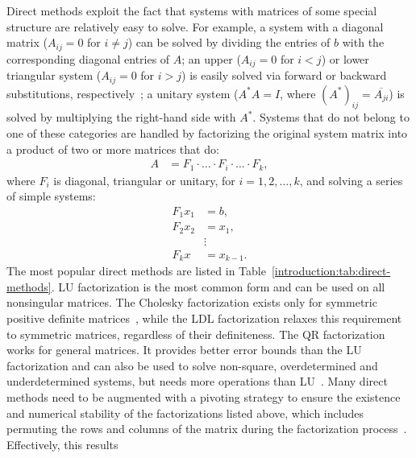 Direct methods exploit the fact that systems with matrices of some special
structure are relatively easy to solve. For example, a system with a diagonal
matrix ($A_{ij} = 0$ for $i \neq j$) can be solved by dividing the entries of
$b$ with the corresponding diagonal entries of $A$; an upper ($A_{ij} = 0$ for
$i < j$) or lower triangular system ($A_{ij} = 0$ for $i > j$) is easily solved
via forward or backward substitutions, respectively~\cite{demmel,Ipsen2009}; a
unitary system ($A^* A = I$, where $(A^*)_{ij} = \overline{A_{ji}}$)
is solved by multiplying the right-hand side with $A^*$. 
Systems that do not belong to one of these categories are handled by
factorizing the original system matrix into a product of two or more matrices
that do:
\begin{align}
    A &= F_1 \cdot \ldots \cdot F_i \cdot \ldots \cdot F_k,
\end{align}
where $F_i$ is diagonal, triangular or unitary, for $i = 1,2, \ldots, k$, and
solving a series of simple systems:
\begin{align}
    F_1 x_1 &= b,\\
    F_2 x_2 &= x_1,\\
    &\vdots \nonumber \\
    F_k x &= x_{k-1}.
\end{align}
The most popular direct methods are listed in
Table~\ref{introduction:tab:direct-methods}. LU factorization is the most common
form and can be used on all nonsingular matrices. The Cholesky factorization
exists only for symmetric positive definite matrices~\cite{demmel}, while the
LDL factorization relaxes this requirement to symmetric matrices, regardless of
their definiteness. The QR factorization works for general matrices. It provides
better error bounds than the LU factorization and can also be used to solve
non-square, overdetermined and underdetermined systems, but needs more
operations than LU~\cite{demmel}.  Many direct methods need to be augmented with
a pivoting strategy to ensure the existence and numerical stability of the
factorizations listed above, which includes permuting the rows and columns of
the matrix during the
factorization process~\cite{demmel,duff}.  
Effectively, this results
